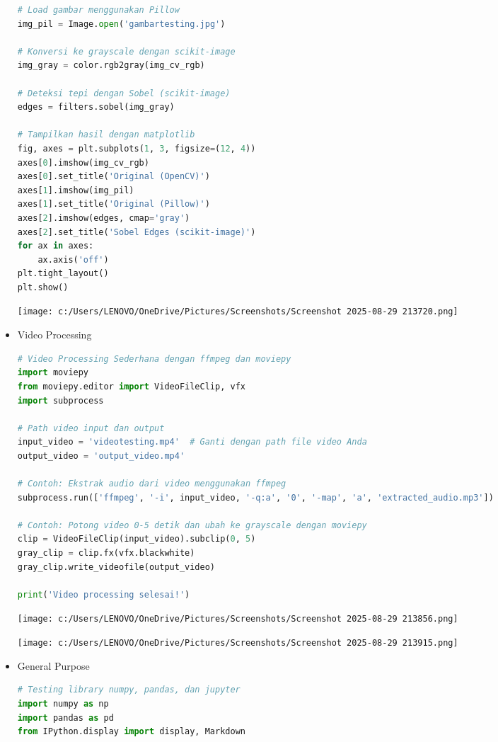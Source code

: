 \documentclass[11pt,a4paper]{article}
\begin{document}
\begin{itemize}
\begin{lstlisting}[language=Python, caption={Image Processing Sederhana dengan OpenCV, Pillow, scikit-image, dan matplotlib}]
# Load gambar menggunakan Pillow
img_pil = Image.open('gambartesting.jpg')

# Konversi ke grayscale dengan scikit-image
img_gray = color.rgb2gray(img_cv_rgb)

# Deteksi tepi dengan Sobel (scikit-image)
edges = filters.sobel(img_gray)

# Tampilkan hasil dengan matplotlib
fig, axes = plt.subplots(1, 3, figsize=(12, 4))
axes[0].imshow(img_cv_rgb)
axes[0].set_title('Original (OpenCV)')
axes[1].imshow(img_pil)
axes[1].set_title('Original (Pillow)')
axes[2].imshow(edges, cmap='gray')
axes[2].set_title('Sobel Edges (scikit-image)')
for ax in axes:
    ax.axis('off')
plt.tight_layout()
plt.show()
        \end{lstlisting}
        \begin{flushleft}
            \texttt{[image: c:/Users/LENOVO/OneDrive/Pictures/Screenshots/Screenshot 2025-08-29 213720.png]}
        \end{flushleft}
    \item Video Processing
        \begin{lstlisting}[language=Python, caption={Video Processing Sederhana dengan ffmpeg dan moviepy}]
# Video Processing Sederhana dengan ffmpeg dan moviepy
import moviepy
from moviepy.editor import VideoFileClip, vfx
import subprocess

# Path video input dan output
input_video = 'videotesting.mp4'  # Ganti dengan path file video Anda
output_video = 'output_video.mp4'

# Contoh: Ekstrak audio dari video menggunakan ffmpeg
subprocess.run(['ffmpeg', '-i', input_video, '-q:a', '0', '-map', 'a', 'extracted_audio.mp3'])

# Contoh: Potong video 0-5 detik dan ubah ke grayscale dengan moviepy
clip = VideoFileClip(input_video).subclip(0, 5)
gray_clip = clip.fx(vfx.blackwhite)
gray_clip.write_videofile(output_video)

print('Video processing selesai!')
        \end{lstlisting}
            \begin{flushleft}
                \texttt{[image: c:/Users/LENOVO/OneDrive/Pictures/Screenshots/Screenshot 2025-08-29 213856.png]}
            \end{flushleft}
            \begin{flushleft}
                \texttt{[image: c:/Users/LENOVO/OneDrive/Pictures/Screenshots/Screenshot 2025-08-29 213915.png]}          \end{flushleft}
            \item General Purpose
        \begin{lstlisting}[language=Python, caption={General Purpose Test dengan numpy, pandas, dan jupyter}]
# Testing library numpy, pandas, dan jupyter
import numpy as np
import pandas as pd
from IPython.display import display, Markdown


\end{lstlisting}
\end{itemize}
\end{document}
